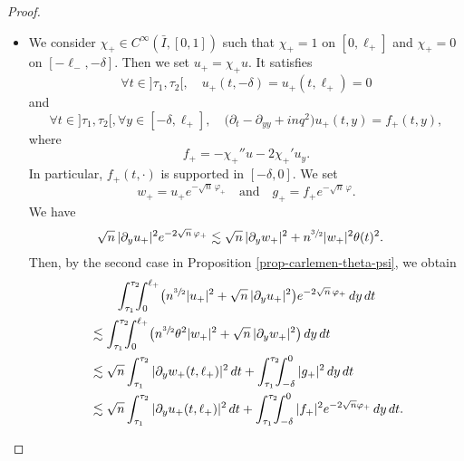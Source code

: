\documentclass[JEP,XML,SOM,Unicode]{cedram}
\theoremstyle{plain}
\theoremstyle{definition}
\newcommand{\abs}[1]{\vert #1\vert}
\newcommand{\1}{\mathds 1}
\let\d\delta
\let\th\theta
\let\f\varphi
\let\h\chi
\begin{document}
\begin{proof}
\begin{itemize}
\item
We consider $\h_+ \in C^\infty(\bar I,[0,1])$ such that $\h_+ = 1$ on $[0,\ell_+]$ and $\h_+ = 0$ on $[-\ell_-,-\d]$. Then we set $u_+ = \h_+ u$. It satisfies
\[
\forall t \in{}]\tau_1,\tau_2[, \quad u_+(t,-\d) = u_+(t,\ell_+) = 0
\]
and
\[
\forall t \in{}]\tau_1,\tau_2[, \forall y \in [-\d,\ell_+], \quad \bigl(\partial_t - \partial_{yy} + inq^2 \bigr) u_+(t,y) = f_+(t,y),
\]
where
\[
f_+ = - \h_+'' u - 2 \h_+' u_y.
\]
In particular, $f_+(t,\cdot)$ is supported in $[-\d,0]$. We set
\[
w_+ = u_+ e^{-\sqrt n\,\f_+}
\quad \text{and} \quad
g_+ = f_+ e^{-\sqrt n\,\f}.
\]
We have
\begin{align*}
\sqrt n\,\abs{\partial_y u_+}^2 e^{-2 \sqrt n\,\f_+}
& \lesssim \sqrt n\,\abs{\partial_y w_+}^2 + n^{\sfrac 32} \abs{w_+}^2 \th(t)^2 .
\end{align*}
Then, by the second case in Proposition \ref{prop-carlemen-theta-psi}, we obtain
\begin{multline}\label{eq++}
\int_{\tau_1}^{\tau_2}\hspace*{-2mm} \int_0^{\ell_+} \bigl(n^{\sfrac 32} \abs {u_+}^2 + \sqrt n\,\abs{\partial_y u_+}^2 \bigr) e^{- 2 \sqrt n\,\f_+} \, dy \, dt\\
\begin{aligned}
& \lesssim \int_{\tau_1}^{\tau_2}\hspace*{-2mm} \int_0^{\ell_+} \bigl(n^{\sfrac 32} \th^2 \abs {w_+}^2 + \sqrt n\,\abs{\partial_y w_+}^2 \bigr) \, dy \, dt\\
& \lesssim \sqrt n \int_{\tau_1}^{\tau_2} \abs{\partial_y w_+(t,\ell_+)}^2 \, dt + \int_{\tau_1}^{\tau_2}\hspace*{-2mm} \int_{-\d}^0 \abs {g_+}^2 \, dy \, dt\\
& \lesssim \sqrt n \int_{\tau_1}^{\tau_2} \abs{\partial_y u_+(t,\ell_+)}^2 \, dt + \int_{\tau_1}^{\tau_2}\hspace*{-2mm} \int_{-\d}^0 \abs {f_+}^2 e^{-2\sqrt n \f_+} \, dy \, dt.
\end{aligned}
\end{multline}


\end{itemize}
\end{proof}
\end{document}
